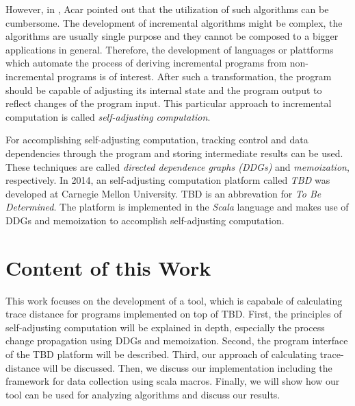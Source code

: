 However, in \cite{Acar2005thesis}, Acar pointed out that the utilization of such algorithms can be cumbersome. The development of incremental algorithms might be complex, the algorithms are usually single purpose and they cannot be composed to a bigger applications in general. Therefore, the development of languages or plattforms which automate the process of deriving incremental programs from non-incremental programs is of interest. After such a transformation, the program should be capable of adjusting its internal state and the program output to reflect changes of the program input. This particular approach to incremental computation is called \textit{self-adjusting computation}.

For accomplishing self-adjusting computation, tracking control and data dependencies through the program and storing intermediate results can be used. These techniques are called \textit{directed dependence graphs (DDGs)} and \textit{memoization}, respectively.
In 2014, an self-adjusting computation platform called \textit{TBD} was developed at Carnegie Mellon University. TBD is an abbrevation for \textit{To Be Determined}. The platform is implemented in the \textit{Scala} language and makes use of DDGs and memoization to accomplish self-adjusting computation. 

\section{Content of this Work}

This work focuses on the development of a tool, which is capabale of calculating trace distance for programs implemented on top of TBD. First, the principles of self-adjusting computation will be explained in depth, especially the process change propagation using DDGs and memoization. Second, the program interface of the TBD platform will be described. Third, our approach of calculating trace-distance will be discussed. Then, we discuss our implementation including the framework for data collection using scala macros. 
Finally, we will show how our tool can be used for analyzing algorithms and discuss our results. 